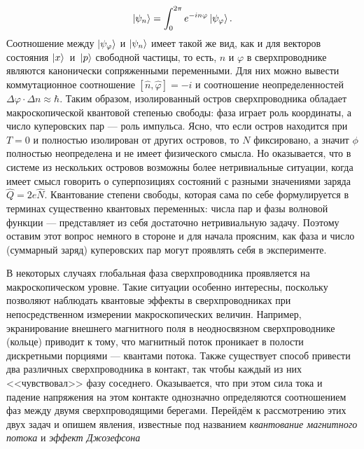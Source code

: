 \begin{equation}
\ket{\psi_n} = \int_{0}^{2 \pi}e^{-i n \varphi} \ket{\psi_\varphi}.
\end{equation} 
Соотношение между $\ket{\psi_\varphi}$ и $\ket{\psi_n}$ имеет такой же вид, как и для векторов состояния $\ket{x}$~и~$\ket{p}$ свободной частицы, то есть, $n$ и $\varphi$ в сверхпроводнике являются канонически сопряженными переменными. Для них можно вывести коммутационное соотношение $[\hat{n}, \hat{\varphi}]=-i$ и соотношение неопределенностей $\Delta\varphi \cdot \Delta n \approx \hbar$. Таким образом, изолированный остров сверхпроводника обладает макроскопической квантовой степенью свободы: фаза играет роль координаты, а число куперовских пар --- роль импульса. Ясно, что если остров находится при $T\!=\!0$ и полностью изолирован от других островов, то $N$ фиксировано, а значит $\phi$ полностью неопределена и не имеет физического смысла. Но оказывается, что в системе из нескольких островов возможны более нетривиальные ситуации, когда имеет смысл говорить о суперпозициях состояний с разными значениями заряда $\hat{Q}\! = \!2e\hat{N}$. Квантование степени свободы, которая сама по себе формулируется в терминах существенно квантовых переменных: числа пар и фазы волновой функции --- представляет из себя достаточно нетривиальную задачу. Поэтому оставим этот вопрос немного в стороне и для начала проясним, как фаза и число (суммарный заряд) куперовских пар могут проявлять себя в эксперименте. 

В некоторых случаях глобальная фаза сверхпроводника проявляется на макроскопическом уровне. Такие ситуации особенно интересны, поскольку позволяют наблюдать квантовые эффекты в сверхпроводниках при непосредственном измерении макроскопических величин. Например, экранирование внешнего магнитного поля в неодносвязном сверхпроводнике (кольце) приводит к тому, что магнитный поток проникает в полости дискретными порциями --- квантами потока. Также существует способ привести два различных сверхпроводника в контакт, так чтобы каждый из них <<чувствовал>> фазу соседнего. Оказывается, что при этом сила тока и падение напряжения на этом контакте однозначно определяются соотношением фаз между двумя сверхпроводящими берегами. Перейдём к рассмотрению этих двух задач и опишем явления, известные под названием \textit{квантование магнитного потока} и \textit{эффект Джозефсона}
